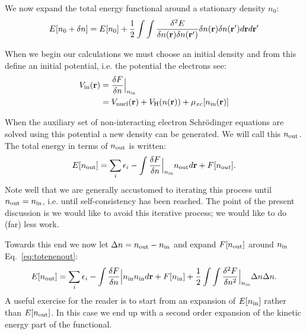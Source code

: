 We now expand the total energy functional around a stationary density $n_0$:
%
\begin{equation}
E[n_{0} + \delta n] = E[n_{0}] + \frac{1}{2}\int\int \frac{\delta^{2} E}{\delta n({\bf r}) \delta n({\bf r}')} \delta n({\bf r})\delta n({\bf r}')d{\bf r} d{\bf r}'
\end{equation}
%

When we begin our calculations we must choose an initial density and from this
define an initial potential, i.e. the potential the electrons see:
%
\begin{align}
V_{\rm in}({\bf r})  & = \frac{\delta F} {\delta n}\Bigr|_{n_{\rm in}} \\
                & = V_{\rm nucl}({\bf r}) + V_{\rm H}(n({\bf r})) + \mu_{xc}[n_{\rm in}({\bf r})]
\end{align}
%

When the auxiliary set of non-interacting electron Schr\"odinger equations are solved using this potential
a new density can be generated. We will call this $n_{\rm out}$. The total energy in terms
of $n_{\rm out}$ is written:
%
\begin{equation}
\label{eq:totennout}
E[n_{\rm out}]= \sum_{i}\epsilon_{i} - \int \frac{\delta F}{\delta n}\Bigr|_{n_{\rm in}} n_{\rm out} d{\bf r} + F[n_{out}].
\end{equation}
%
Note well that we are generally accustomed to iterating this process until $n_{\rm out}=n_{\rm in}$, i.e.
until self-consistency has been reached. The point of the present discussion is we would like
to avoid this iterative process; we would like to do (far) less work.


Towards this end we now let $\Delta n = n_{\rm out}-n_{\rm in}$ and expand $F[n_{\rm out}]$ 
around $n_{\rm in}$ Eq.~\ref{eq:totenenout}:
%
\begin{equation}
\label{eq:toten2}
	E[n_{\rm out}]= \sum_{i}\epsilon_{i} - \int \frac{\delta F}{\delta n}\Bigr|{n_{\rm in}}n_{\rm in} d{\bf r} + F[n_{\rm in }] 
+ \frac{1}{2}\int\int  \frac{\delta^{2} F}{\delta n^2}\Bigr|_{n_{\rm in}} \Delta n \Delta n.
\end{equation}
%
A useful exercise for the reader is to start from an expansion of $E[n_{\rm in}]$
rather than $E[n_{\rm out}]$. In this case we end up with a second order expansion 
of the kinetic energy part of the functional. 

